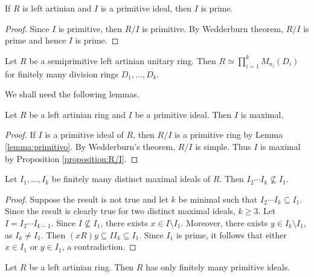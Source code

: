\begin{lemma}
    If $R$ is left artinian and $I$ is a primitive ideal, then
    $I$ is prime. 
\end{lemma}


\begin{proof}
    Since $I$ is primitive, then $R/I$ is primitive. By Wedderburn theorem, 
    $R/I$ is prime and hence $I$ is prime. 
\end{proof}

\begin{theorem}
\label{thm:ArtinWedderburn_version2}
    Let $R$ be a semiprimitive left artinian unitary ring. Then
    $R\simeq\prod_{i=1}^kM_{n_i}(D_i)$ for finitely many
    division rings $D_1,\dots,D_k$. 
\end{theorem}

We shall need the following lemmas.

\begin{lemma}
\label{lem:primitive=>maximal}
    Let $R$ be a left artinian ring and $I$ be a primitive ideal. 
    Then $I$ is maximal. 
\end{lemma}

\begin{proof}
    If $I$ is a primitive ideal of $R$, then $R/I$ is a primitive ring
    by Lemma \ref{lemma:primitivo}. By Wedderburn's theorem, $R/I$ is
    simple. Thus $I$ is maximal by Proposition \ref{proposition:R/I}. 
\end{proof}

\begin{lemma}
    Let $I_1,\dots,I_k$ be finitely many distinct maximal ideals of $R$. 
    Then $I_2\cdots I_k\not\subseteq I_1$.   
\end{lemma}

\begin{proof}
    Suppose the result is not true and let $k$ be minimal
    such that $I_2\cdots I_k\subseteq I_1$. Since the result is clearly
    true for two distinct maximal ideals, $k\geq3$. Let $I=I_2\cdots I_{k-1}$. 
    Since $I\not\subseteq I_1$, there exists $x\in I\setminus I_1$. Moreover,  
    there exists $y\in I_k\setminus I_1$, as 
    $I_k\ne I_1$. 
    Then 
    $(xR)y\subseteq II_k\subseteq I_1$. Since $I_1$ is prime, 
    it follows that either $x\in I_1$ or $y\in I_1$, a contradiction.   
\end{proof}

\begin{lemma}
    Let $R$ be a left artinian ring. Then $R$ has only 
    finitely many primitive ideals.
\end{lemma}

